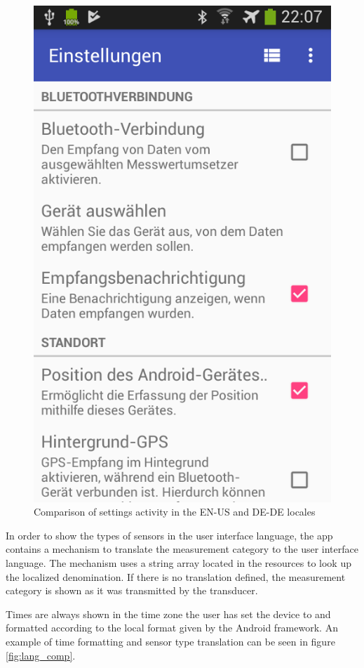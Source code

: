 \begin{figure}
\begin{minipage}{.5\textwidth}
  \includegraphics[width=.8\linewidth]{src/settings_de.png}
\end{minipage}
  \caption{Comparison of settings activity in the EN-US and DE-DE locales}
  \label{fig:settings_comp}
\end{figure}

In order to show the types of sensors in the user interface language, the app contains a mechanism to translate the measurement category to the user interface language. The mechanism uses a string array located in the resources to look up the localized denomination. If there is no translation defined, the measurement category is shown as it was transmitted by the transducer.

Times are always shown in the time zone the user has set the device to and formatted according to the local format given by the Android framework. An example of time formatting and sensor type translation can be seen in figure \ref{fig:lang_comp}.


